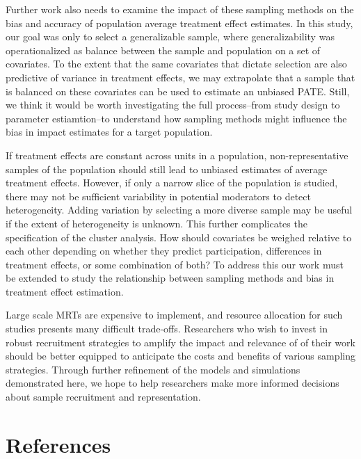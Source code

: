 \documentclass[
  english,
  man,floatsintext]{apa6}
\begin{document}
Further work also needs to examine the impact of these sampling methods on the bias and accuracy of population average treatment effect estimates. In this study, our goal was only to select a generalizable sample, where generalizability was operationalized as balance between the sample and population on a set of covariates. To the extent that the same covariates that dictate selection are also predictive of variance in treatment effects, we may extrapolate that a sample that is balanced on these covariates can be used to estimate an unbiased PATE. Still, we think it would be worth investigating the full process--from study design to parameter estiamtion--to understand how sampling methods might influence the bias in impact estimates for a target population.

If treatment effects are constant across units in a population, non-representative samples of the population should still lead to unbiased estimates of average treatment effects. However, if only a narrow slice of the population is studied, there may not be sufficient variability in potential moderators to detect heterogeneity. Adding variation by selecting a more diverse sample may be useful if the extent of heterogeneity is unknown. This further complicates the specification of the cluster analysis. How should covariates be weighed relative to each other depending on whether they predict participation, differences in treatment effects, or some combination of both? To address this our work must be extended to study the relationship between sampling methods and bias in treatment effect estimation.

Large scale MRTs are expensive to implement, and resource allocation for such studies presents many difficult trade-offs. Researchers who wish to invest in robust recruitment strategies to amplify the impact and relevance of of their work should be better equipped to anticipate the costs and benefits of various sampling strategies. Through further refinement of the models and simulations demonstrated here, we hope to help researchers make more informed decisions about sample recruitment and representation.

\newpage

\hypertarget{references}{%
\section{References}\label{references}}
\end{document}
